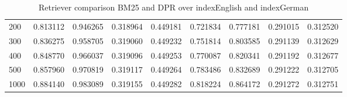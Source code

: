 \begin{table}
\begin{tabular}{lrrrrrrrr}
    200 & 0.813112 & 0.946265 & 0.318964 & 0.449181 & 0.721834 & 0.777181 & 0.291015 & 0.312520 \\
    300 & 0.836275 & 0.958705 & 0.319060 & 0.449232 & 0.751814 & 0.803585 & 0.291139 & 0.312629 \\
    400 & 0.848770 & 0.966037 & 0.319096 & 0.449253 & 0.770087 & 0.820341 & 0.291192 & 0.312677 \\
    500 & 0.857960 & 0.970819 & 0.319117 & 0.449264 & 0.783486 & 0.832689 & 0.291222 & 0.312705 \\
    1000 & 0.884140 & 0.983089 & 0.319155 & 0.449282 & 0.818224 & 0.864172 & 0.291272 & 0.312751 \\
    \bottomrule
    \end{tabular}
    \caption{Retriever comparison BM25 and DPR over indexEnglish and indexGerman}
\end{table}

